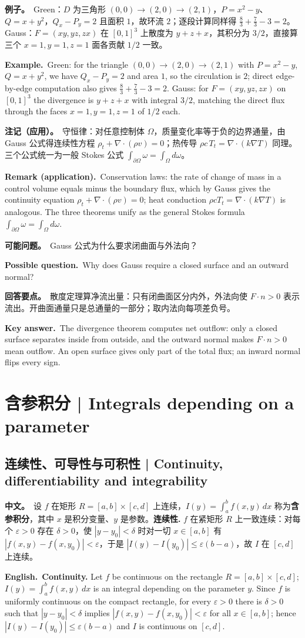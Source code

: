\documentclass[UTF8,11pt,a4paper]{ctexart}
\newcommand{\BOTH}[2]{\par\noindent\textbf{中文。}\ #1\par\noindent\textbf{English.}\ #2\par}
\newcommand{\EX}[2]{\par\noindent\textbf{例子。}\ #1\par\noindent\textbf{Example.}\ #2\par}
\newcommand{\ASK}[4]{\begin{samepage}\par\noindent\textbf{可能问题。}\ #1\par\noindent\textbf{Possible question.}\ #2\par\noindent\textbf{回答要点。}\ #3\par\noindent\textbf{Key answer.}\ #4\medskip\end{samepage}}
\newcommand{\REMARK}[2]{\par\noindent\textbf{注记（应用）。}\ #1\par\noindent\textbf{Remark (application).}\ #2\par}
\begin{document}
\EX{Green：$D$ 为三角形 $(0,0)\to(2,0)\to(2,1)$，$P=x^2-y$、$Q=x+y^2$，$Q_x-P_y=2$ 且面积 $1$，故环流 $2$；逐段计算同样得 $\frac83+\frac73-3=2$。Gauss：$F=(xy,yz,zx)$ 在 $[0,1]^3$ 上散度为 $y+z+x$，其积分为 $3/2$，直接算三个 $x=1,y=1,z=1$ 面各贡献 $1/2$ 一致。}{Green: for the triangle $(0,0)\to(2,0)\to(2,1)$ with $P=x^2-y$, $Q=x+y^2$, we have $Q_x-P_y=2$ and area $1$, so the circulation is $2$; direct edge-by-edge computation also gives $\frac83+\frac73-3=2$. Gauss: for $F=(xy,yz,zx)$ on $[0,1]^3$ the divergence is $y+z+x$ with integral $3/2$, matching the direct flux through the faces $x=1,y=1,z=1$ of $1/2$ each.}
\REMARK{守恒律：对任意控制体 $\Omega$，质量变化率等于负的边界通量，由 Gauss 公式得连续性方程 $\rho_t+\nabla\cdot(\rho v)=0$；热传导 $\rho c\,T_t=\nabla\cdot(k\nabla T)$ 同理。三个公式统一为一般 Stokes 公式 $\int_{\partial\Omega}\omega=\int_\Omega d\omega$。}{Conservation laws: the rate of change of mass in a control volume equals minus the boundary flux, which by Gauss gives the continuity equation $\rho_t+\nabla\cdot(\rho v)=0$; heat conduction $\rho cT_t=\nabla\cdot(k\nabla T)$ is analogous. The three theorems unify as the general Stokes formula $\int_{\partial\Omega}\omega=\int_\Omega d\omega$.}
\ASK{Gauss 公式为什么要求闭曲面与外法向？}{Why does Gauss require a closed surface and an outward normal?}{散度定理算净流出量：只有闭曲面区分内外，外法向使 $F\cdot n>0$ 表示流出。开曲面通量只是总通量的一部分；取内法向每项差负号。}{The divergence theorem computes net outflow: only a closed surface separates inside from outside, and the outward normal makes $F\cdot n>0$ mean outflow. An open surface gives only part of the total flux; an inward normal flips every sign.}

\section{含参积分 | Integrals depending on a parameter}

\subsection{连续性、可导性与可积性 | Continuity, differentiability and integrability}

\BOTH{设 $f$ 在矩形 $R=[a,b]\times[c,d]$ 上连续，$I(y)=\int_a^b f(x,y)\,dx$ 称为\textbf{含参积分}，其中 $x$ 是积分变量、$y$ 是参数。\textbf{连续性.} $f$ 在紧矩形 $R$ 上一致连续：对每个 $\varepsilon>0$ 存在 $\delta>0$，使 $|y-y_0|<\delta$ 时对一切 $x\in[a,b]$ 有 $|f(x,y)-f(x,y_0)|<\varepsilon$，于是 $|I(y)-I(y_0)|\le\varepsilon(b-a)$，故 $I$ 在 $[c,d]$ 上连续。}{\textbf{Continuity.} Let $f$ be continuous on the rectangle $R=[a,b]\times[c,d]$; $I(y)=\int_a^b f(x,y)\,dx$ is an integral depending on the parameter $y$. Since $f$ is uniformly continuous on the compact rectangle, for every $\varepsilon>0$ there is $\delta>0$ such that $|y-y_0|<\delta$ implies $|f(x,y)-f(x,y_0)|<\varepsilon$ for all $x\in[a,b]$; hence $|I(y)-I(y_0)|\le\varepsilon(b-a)$ and $I$ is continuous on $[c,d]$.}
\end{document}
